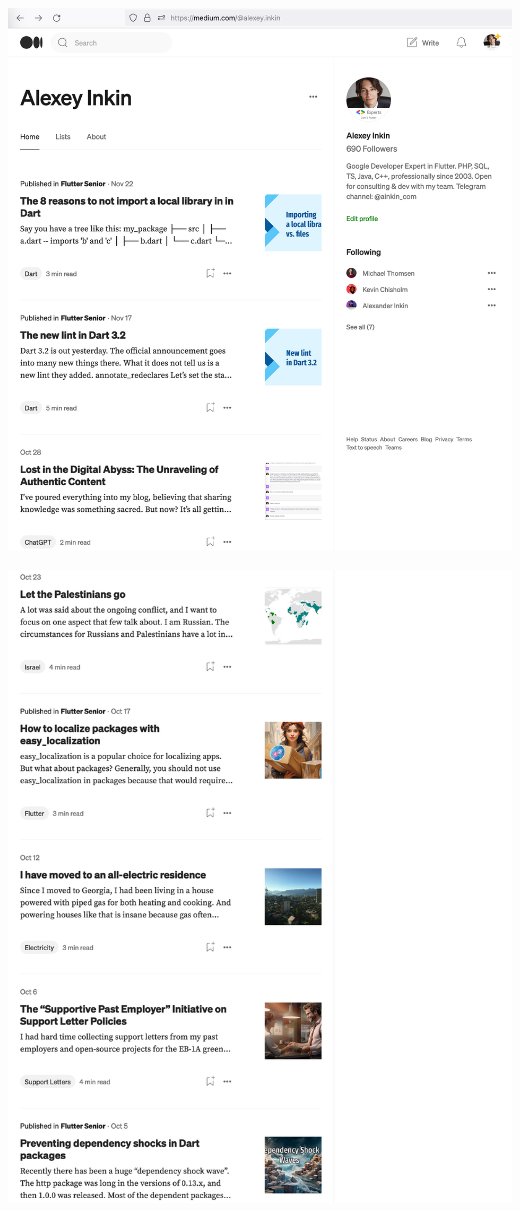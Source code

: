 
\begin{center}
    \includegraphics[width=40em]{medium-articles-p1}
\end{center}
\WillContinue
\pagebreak

\Continuing
\begin{center}
    \includegraphics[width=40em]{medium-articles-p2}
\end{center}
\WillContinue
\pagebreak

